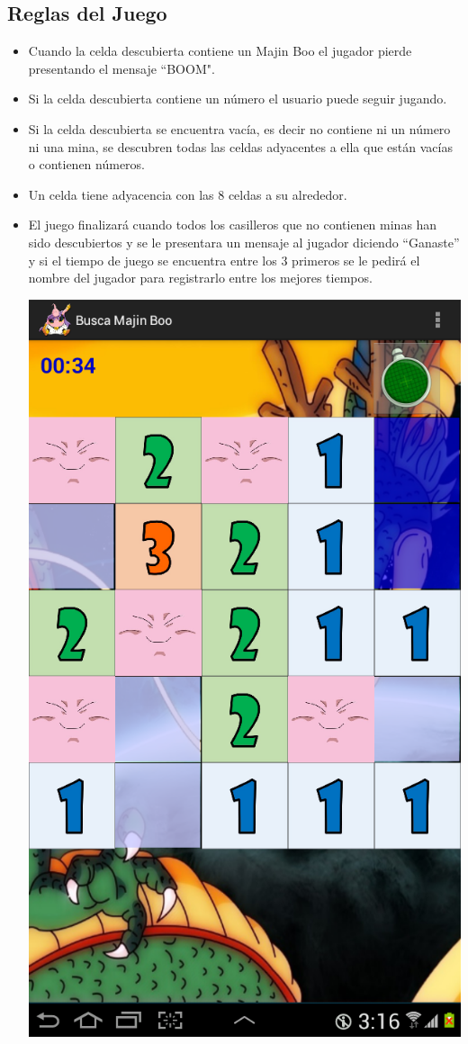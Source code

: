 \documentclass[11pt]{article} %
\begin{document}
\subsection{Reglas del Juego}
\begin{itemize}
\item Cuando la celda descubierta contiene un Majin Boo el jugador pierde  presentando el mensaje ``BOOM".
\item Si la celda descubierta contiene un número el usuario puede seguir jugando.
\item Si la celda descubierta se encuentra vacía, es decir no contiene ni un número ni una mina, se descubren todas las celdas
adyacentes a ella que están vacías o contienen números.
\item Un celda tiene adyacencia con las 8 celdas a su alrededor.
\item El juego finalizará cuando todos los casilleros que no contienen minas han sido descubiertos y se le presentara un mensaje al jugador diciendo “Ganaste” y si el tiempo de juego se encuentra entre los 3 primeros se le pedirá el nombre del jugador para registrarlo entre los mejores tiempos.
\begin{center}
\includegraphics[scale=0.2]{Imagenes/SSPerder.png}

\end{center}
\end{itemize}
\end{document}
